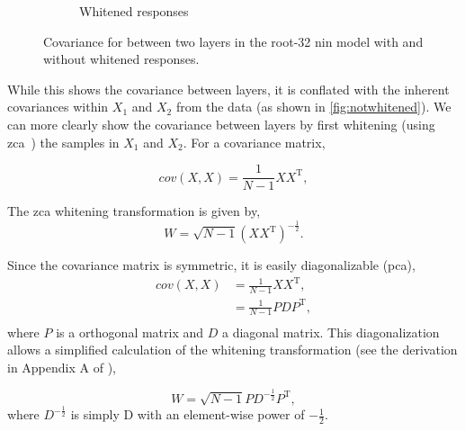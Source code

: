 \documentclass[thesis]{subfiles}
\begin{document}
\begin{figure}[tbp]
\begin{subfigure}[b]{0.3\textheight}
			\caption{Whitened responses}
			\label{fig:whitened}
		\end{subfigure}
		\caption[Inter-layer covariance with/without whitened responses]{Covariance for between two layers in the root-32 \gls{nin} model with and without whitened responses.}
		\label{fig:whitevsnot}
	\end{figure}
	
	While this shows the covariance between layers, it is conflated with the inherent covariances within $X_1$ and $X_2$ from the data (as shown in \cref{fig:notwhitened}). We can more clearly show the covariance between layers by first whitening (using \gls{zca}~\citep{CIFAR10}) the samples in $X_1$ and $X_2$. For a covariance matrix,
	
	\begin{equation}
	cov(X, X) = \frac{1}{N-1} XX^\textrm{T},
	\end{equation}
	
	The \gls{zca} whitening transformation is given by,
	\begin{equation}
	W = \sqrt{N-1}\left(XX^\textrm{T}\right)^{-\frac{1}{2}}.
	\end{equation}
	
	Since the covariance matrix is symmetric, it is easily diagonalizable (\ie \gls{pca}),
	\begin{align}
	cov(X, X) &= \frac{1}{N-1} XX^\textrm{T},\\
	&=\frac{1}{N-1} PDP^\textrm{T},\\
	\end{align}
	where $P$ is a orthogonal matrix and $D$ a diagonal matrix. This diagonalization allows a simplified calculation of the whitening transformation (see the derivation in Appendix A of \citet{CIFAR10}),
	
	\begin{equation}
	W = \sqrt{N-1}PD^{-\frac{1}{2}}P^\textrm{T},
	\end{equation}
	where $D^{-\frac{1}{2}}$ is simply D with an element-wise power of $-\frac{1}{2}$.
	
\end{document}
